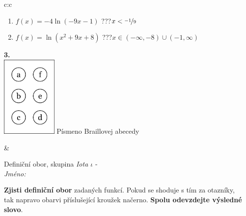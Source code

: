 \documentclass[10pt]{report}
\begin{document}
\begin{tabular}{c:c}
\begin{minipage}[c][104.5mm][t]{0.5\linewidth}
\begin{center}
\begin{minipage}{0.79\linewidth}
\begin{center}
\begin{varwidth}{\linewidth}
\begin{enumerate}
\item $f(x)=-4\ln{(-9x-1)}$\quad \dotfill\; ???\;\dotfill \quad $x<\nicefrac{-1}{9}$
\item $f(x)=\ln{(x^2+9x+8)}$\quad \dotfill\; ???\;\dotfill \quad $x\in(-\infty , -8)\cup(-1 , \infty)$
\end{enumerate}
\end{varwidth}
\end{center}
\end{minipage}
\begin{minipage}{0.20\linewidth}
\begin{center}
{\Huge\bfseries 3.} \\[2mm]
\includegraphics[height=40mm]{../images/braille.png}
{\small Písmeno Braillovej abecedy}
\end{center}
\end{minipage}
\end{center}
\end{minipage}
&
\begin{minipage}[c][104.5mm][t]{0.5\linewidth}
\begin{center}
\vspace{7mm}
{\huge Definiční obor, skupina \textit{Iota $\iota$} -}\\[5mm]
\textit{Jméno:}\phantom{xxxxxxxxxxxxxxxxxxxxxxxxxxxxxxxxxxxxxxxxxxxxxxxxxxxxxxxxxxxxxxxxx}\\[5mm]
\begin{minipage}{0.95\linewidth}
\begin{center}
\textbf{Zjisti definiční obor} zadaných funkcí. Pokud se shoduje s tím za otazníky,\\tak napravo obarvi příslušející kroužek načerno. \textbf{Spolu odevzdejte výsledné slovo}.
\end{center}
\end{minipage}
\\[1mm]
\begin{minipage}{0.79\linewidth}
\begin{center}
\begin{varwidth}{\linewidth}
\begin{enumerate}

\end{enumerate}
\end{varwidth}
\end{center}
\end{minipage}
\end{center}
\end{minipage}
\end{tabular}
\end{document}
